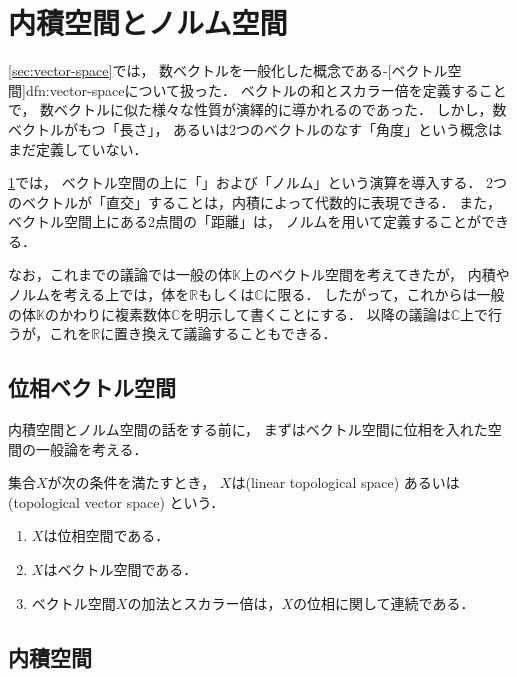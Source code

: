 \documentclass[../sotsu.tex]{subfiles}
\begin{document}
\section{内積空間とノルム空間}
\label{sec:inner-product-and-norm}

\cref{sec:vector-space}では，
数ベクトルを一般化した概念である-[ベクトル空間]{dfn:vector-space}について扱った．
ベクトルの和とスカラー倍を定義することで，
数ベクトルに似た様々な性質が演繹的に導かれるのであった．
しかし，数ベクトルがもつ「長さ」，
あるいは2つのベクトルのなす「角度」という概念はまだ定義していない．

\cref{sec:inner-product-and-norm}では，
ベクトル空間の上に「」および「ノルム」という演算を導入する．
2つのベクトルが「直交」することは，内積によって代数的に表現できる．
また，ベクトル空間上にある2点間の「距離」は，
ノルムを用いて定義することができる．

なお，これまでの議論では一般の体$𝕂$上のベクトル空間を考えてきたが，
内積やノルムを考える上では，体を$ℝ$もしくは$ℂ$に限る．
したがって，これからは一般の体$𝕂$のかわりに複素数体$ℂ$を明示して書くことにする．
以降の議論は$ℂ$上で行うが，これを$ℝ$に置き換えて議論することもできる．



\subsection{位相ベクトル空間}

内積空間とノルム空間の話をする前に，
まずはベクトル空間に位相を入れた空間の一般論を考える．

\begin{definition}[位相ベクトル空間]
    集合$X$が次の条件を満たすとき，
    $X$は(linear topological space)%
    あるいは(topological vector space)%
    という．
    \begin{enumerate}
        \item $X$は位相空間である．
        \item $X$はベクトル空間である．
        \item ベクトル空間$X$の加法とスカラー倍は，$X$の位相に関して連続である．
    \end{enumerate}
\end{definition}



\subsection{内積空間}
\label{sec:inner-product-space}
\end{document}
